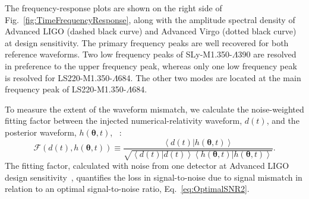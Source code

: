 \documentclass[../Thesis.tex]{subfiles}
\begin{document}
     The frequency-response plots  are shown on the right side of Fig.~\ref{fig:TimeFrequencyResponse}, along with the amplitude spectral density of Advanced LIGO (dashed black curve) and Advanced Virgo (dotted black curve) at design sensitivity. 
     The primary frequency peaks are well recovered for both reference waveforms. 
     Two low frequency peaks of SLy-M1.350-$\Lambda$390 are resolved in preference to the upper frequency peak, whereas only one low frequency peak is resolved for LS220-M1.350-$\Lambda$684. The other two modes are located at the main frequency peak of LS220-M1.350-$\Lambda$684.\par

     To measure the extent of the waveform mismatch, we calculate the noise-weighted fitting factor between the injected numerical-relativity waveform, $d(t)$, and the posterior waveform, $h(\boldsymbol{\theta},t)$, ~\cite{Apostolatos95}:
    \begin{equation}
    	\mathcal{F}(d(t),h(\boldsymbol{\theta},t))\equiv\frac{\left<d(t)|h(\boldsymbol{\theta},t)\right>}{\sqrt{\left<d(t)|d(t)\right>\left<h(\boldsymbol{\theta},t)|h(\boldsymbol{\theta},t)\right>}}.\label{eq:FF2}
    \end{equation}
    The fitting factor, calculated with noise from one detector at Advanced LIGO design sensitivity~\cite{PSD:aLIGO}, quantifies the loss in signal-to-noise due to signal mismatch in relation to an optimal signal-to-noise ratio, Eq.~\ref{eq:OptimalSNR2}. \par
 
\end{document}
